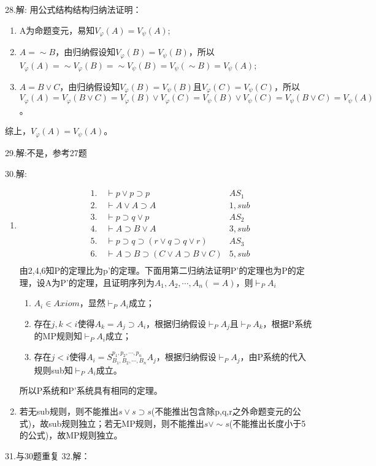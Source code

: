 \documentclass[a4paper]{ctexart}
\begin{document}
\noindent 28.解:
用公式结构结构归纳法证明：
\begin{enumerate}
  \item A为命题变元，易知$V_\varphi(A)=V_\psi(A)$;
  \item $A=\sim B$，由归纳假设知$V_\varphi(B)=V_\psi(B)$，所以$V_\varphi(A)=\sim V_\varphi(B)=\sim V_\psi(B)=V_\psi(\sim B)=V_\psi(A)$;
  \item $A=B\vee C$，由归纳假设知$V_\varphi(B)=V_\psi(B)$且$V_\varphi(C)=V_\psi(C)$，所以$V_\varphi(A)=V_\varphi(B\vee C)=V_\varphi(B)\vee V_\varphi(C)=V_\psi(B)\vee V_\psi(C)=V_\psi(B\vee C)=V_\psi(A)$。
\end{enumerate}
综上，$V_\varphi(A)=V_\psi(A)$。\newline

\noindent 29.解:不是，参考27题

\noindent 30.解:
\begin{enumerate}
  \item \begin{align*}
    &1. \quad\vdash p\vee p\supset p &AS_1 \\
    &2. \quad\vdash A\vee A\supset A &1,sub \\
    &3. \quad\vdash p\supset q\vee p &AS_2 \\
    &4. \quad\vdash A\supset B\vee A &3,sub \\
    &5. \quad\vdash p\supset q\supset(r\vee q\supset q\vee r)&AS_3 \\
    &6. \quad\vdash A\supset B\supset(C\vee A\supset B\vee C)&5,sub \\
  \end{align*}
  由2,4,6知P的定理比为p'的定理。下面用第二归纳法证明P'的定理也为P的定理，设A为P'的定理，且证明序列为$A_1,A_2,\cdots,A_n(=A)$，则$\vdash_PA_i$
  \begin{enumerate}
    \item $A_i\in Axiom$，显然$\vdash_PA_i$成立；
    \item 存在$j,k<i$使得$A_k=A_j\supset A_i$，根据归纳假设$\vdash_PA_j$且$\vdash_PA_k$，根据P系统的MP规则知$\vdash_PA_i$成立；
    \item 存在$j<i$使得$A_i=S_{B_1,B_2,\cdots,B_n}^{p_1,p_2,\cdots,p_n}A_j$，根据归纳假设$\vdash_PA_j$，由P系统的代入规则sub知$\vdash_PA_i$成立。
  \end{enumerate}
  所以P系统和P'系统具有相同的定理。
  \item 若无sub规则，则不能推出$s\vee s\supset s$(不能推出包含除p,q,r之外命题变元的公式)，故sub规则独立；若无MP规则，则不能推出$s\vee\sim s$(不能推出长度小于5的公式)，故MP规则独立。
\end{enumerate}
\noindent 31.与30题重复
\noindent 32.解：
\end{document}
